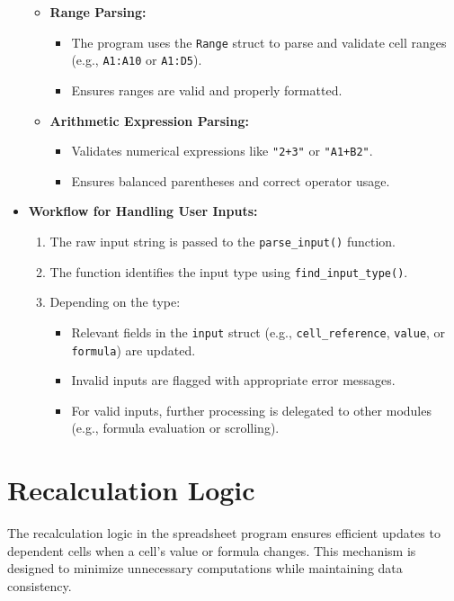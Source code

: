 \documentclass{article}
\begin{document}
\begin{itemize}
\begin{itemize}
        \item \textbf{Range Parsing:}
        \begin{itemize}
            \item The program uses the \texttt{Range} struct to parse and validate cell ranges (e.g., \texttt{A1:A10} or \texttt{A1:D5}).
            \item Ensures ranges are valid and properly formatted.
        \end{itemize}

        \item \textbf{Arithmetic Expression Parsing:}
        \begin{itemize}
            \item Validates numerical expressions like \texttt{"2+3"} or \texttt{"A1+B2"}.
            \item Ensures balanced parentheses and correct operator usage.
        \end{itemize}
    \end{itemize}

    \item \textbf{Workflow for Handling User Inputs:}
    \begin{enumerate}
        \item The raw input string is passed to the \texttt{parse\_input()} function.
        \item The function identifies the input type using \texttt{find\_input\_type()}.
        \item Depending on the type:
        \begin{itemize}
            \item Relevant fields in the \texttt{input} struct (e.g., \texttt{cell\_reference}, \texttt{value}, or \texttt{formula}) are updated.
            \item Invalid inputs are flagged with appropriate error messages.
            \item For valid inputs, further processing is delegated to other modules (e.g., formula evaluation or scrolling).
        \end{itemize}
    \end{enumerate}
\end{itemize}

\section{Recalculation Logic}
The recalculation logic in the spreadsheet program ensures efficient updates to dependent cells when a cell's value or formula changes. This mechanism is designed to minimize unnecessary computations while maintaining data consistency.
\end{document}
